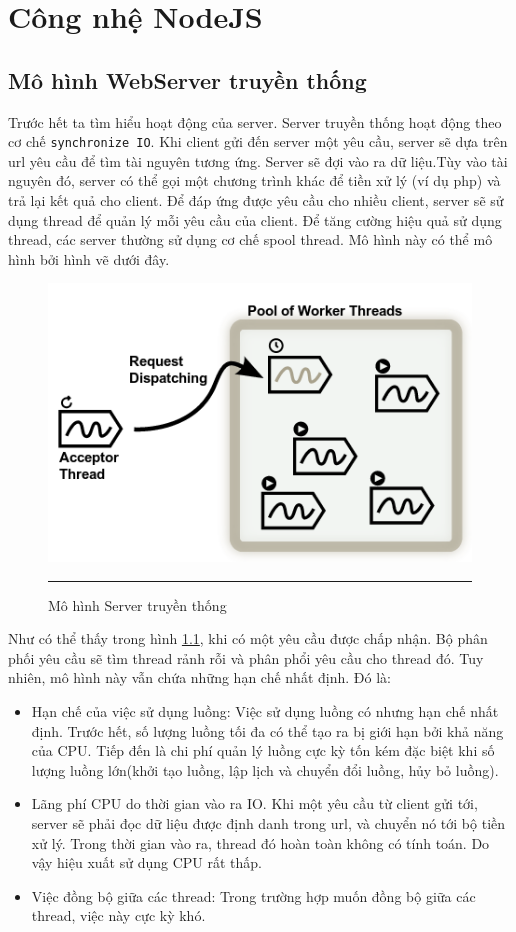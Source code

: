 ﻿\chapter{Công nhệ NodeJS}
\label{Công nhệ NodeJS}

\section{Mô hình WebServer truyền thống}
    Trước hết ta tìm hiểu hoạt động của server.  Server truyền thống hoạt động theo cơ chế \texttt{synchronize IO}. Khi client gửi đến server một yêu cầu, server sẽ dựa trên url yêu cầu để tìm tài nguyên tương ứng. Server sẽ đợi vào ra dữ liệu.Tùy vào tài nguyên đó, server có thể gọi một chương trình khác để tiền xử lý (ví dụ php) và trả lại kết quả cho client. Để đáp ứng được yêu cầu cho nhiều client, server sẽ sử dụng thread để quản lý mỗi yêu cầu của client. Để tăng cường hiệu quả sử dụng thread, các server thường sử dụng cơ chế spool thread. Mô hình này có thể mô hình bởi hình vẽ dưới đây. \\
	\begin{figure}
        \centering
        \includegraphics[scale=0.7]{io}
        \rule{35em}{0.5pt}
        \caption{Mô hình Server truyền thống}
        \label{fig:io}
    \end{figure}
	Như có thể thấy trong hình \ref{fig:io}, khi có một yêu cầu được chấp nhận. Bộ phân phối yêu cầu sẽ tìm thread rảnh rỗi và phân phổi yêu cầu cho thread đó.
	Tuy nhiên, mô hình này vẫn chứa những hạn chế nhất định. Đó là: \\
	\begin{itemize}
		\item Hạn chế của  việc sử dụng luồng: Việc sử dụng luồng có nhưng hạn chế nhất định. Trước hết, số lượng luồng tối đa có thể tạo ra bị giới hạn bởi khả năng của CPU. Tiếp đến là chi phí quản lý luồng cực kỳ tốn kém đặc biệt khi số lượng luồng lớn(khởi tạo luồng, lập lịch và chuyển đổi luồng, hủy bỏ luồng).
		\item Lãng phí CPU do thời gian vào ra IO. Khi một yêu cầu từ client gửi tới, server sẽ phải đọc dữ liệu được định danh trong url, và chuyển nó tới bộ tiền xử lý. Trong thời gian vào ra, thread đó hoàn toàn không có tính toán. Do vậy hiệu xuất sử dụng CPU rất thấp.
		\item Việc đồng bộ giữa các thread: Trong trường hợp  muốn đồng bộ giữa các thread, việc này cực kỳ khó.
	\end{itemize}

